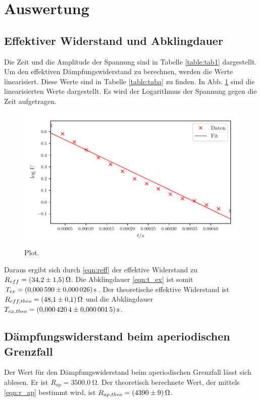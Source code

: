 \section{Auswertung}
\label{sec:Auswertung}

\subsection{Effektiver Widerstand und Abklingdauer} 
Die Zeit und die Amplitude der Spannung sind in Tabelle
\ref{table:tab1} dargestellt. Um den effektiven Dämpfungswiderstand
zu berechnen, werden die Werte linearisiert. Diese Werte sind in
Tabelle \ref{table:taba} zu finden. In Abb. \ref{fig:plota}
sind die linearisierten Werte dargestellt. Es wird der
Logarithmus der Spannung gegen die Zeit aufgetragen.


\begin{figure}
  \centering
  \includegraphics{build/plota.pdf}
  \caption{Plot.}
  \label{fig:plota}
\end{figure}
\noindent Daraus ergibt sich durch \eqref{eqn:reff}%
der effektive Widerstand zu $R_{eff} = \SI{34.2 \pm 1.5}{\ohm}$.
Die Abklingdauer \ref{eqn:t_ex} ist somit $T_{ex} = \SI{0.000590 \pm 0.000026}{\second}$.
\newline
Der theoretische effektive Widerstand ist $R_{eff,theo} = \SI{48.1 \pm 0.1}{\ohm}$
und die Abklingdauer $T_{ex,theo} = \SI{0.0004204 \pm 0.0000015}{\second}$. %

\subsection{Dämpfungswiderstand beim aperiodischen Grenzfall}
Der Wert für den Dämpfungswiderstand beim aperiodischen Grenzfall
lässt sich ablesen. Er ist $R_{ap} = \SI{3500.0}{\ohm}$.
\newline
Der theoretisch berechnete Wert, der mittels \eqref{eqn:r_ap}
bestimmt wird, ist $R_{ap,theo} = \SI{4390 \pm 9}{\ohm}$.

